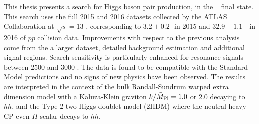 This thesis presents a search for Higgs boson pair production, in the \bbbb~ final state. 
This search uses the full 2015 and 2016 datasets collected by the ATLAS Collaboration at $\sqrt{s}=13$ \TeV, corresponding to $3.2 \pm 0.2$\,\ifb\ in 2015 and $32.9 \pm 1.1$\, \ifb\ in 2016 of $pp$ collision data.
Improvements with respect to the previous analysis come from the a larger dataset, detailed background estimation and additional signal regions.
Search sensitivity is particularly enhanced for resonance signals between $2500$ \GeV and $3000$ \GeV.
The data is found to be compatible with the Standard Model predictions and no signs of new physics have been observed.
The results are interpreted in the context of the bulk Randall-Sundrum warped extra dimension model with a Kaluza-Klein graviton $k/\bar{M}_{\rm Pl} = 1.0$ or $2.0$ decaying to $hh$, and the Type 2 two-Higgs doublet model (2HDM) where the neutral heavy CP-even $H$ scalar decays to $hh$.